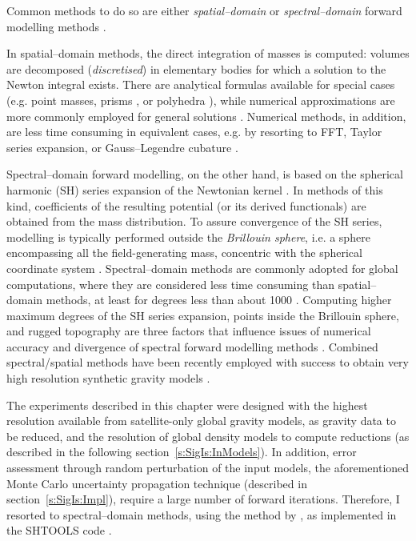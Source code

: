 Common methods to do so are either \textit{spatial--domain} or \textit{spectral--domain} forward modelling methods \parencite{Kuhn2005}.

In spatial--domain methods, the direct integration of masses is computed: volumes are decomposed (\textit{discretised}) in elementary bodies for which a solution to the Newton integral exists.
There are analytical formulas available for special cases (e.g. point masses, prisms \cites{Nagy2000}{Nagy2002}, or polyhedra \cites{Tsoulis2012}), while numerical approximations are more commonly employed for general solutions \parencites[e.g. spherical tesseroids][]{Heck2006}{Uieda2016}.
Numerical methods, in addition, are less time consuming in equivalent cases, e.g. by resorting to FFT, Taylor series expansion, or Gauss--Legendre cubature \parencite[see][and references therein]{Grombein2013}.

Spectral--domain forward modelling, on the other hand, is based on the spherical harmonic (SH) series expansion of the Newtonian kernel \parencites{Rummel1988}{Blakely1996}{Root2015}{Wieczorek2007}.
In methods of this kind, coefficients of the resulting potential (or its derived functionals) are obtained from the mass distribution.
To assure convergence of the SH series, modelling is typically performed outside the \textit{Brillouin sphere}, i.e. a sphere encompassing all the field-generating mass, concentric with the spherical coordinate system \parencite{Moritz1980}.
Spectral--domain methods are commonly adopted for global computations, where they are considered less time consuming than spatial--domain methods, at least for degrees less than about 1000 \parencite{Kuhn2005}.
Computing higher maximum degrees of the SH series expansion, points inside the Brillouin sphere, and rugged topography are three factors that influence issues of numerical accuracy and divergence of spectral forward modelling methods \parencites{Hu2015}{Hirt2017}.
Combined spectral/spatial methods have been recently employed with success to obtain very high resolution synthetic gravity models \parencite{Hirt2019}.

The experiments described in this chapter were designed with the highest resolution available from satellite-only global gravity models, as gravity data to be reduced, and the resolution of global density models to compute reductions (as described in the following section~\ref{s:SigIs:InModels}).
In addition, error assessment through random perturbation of the input models, the aforementioned Monte Carlo uncertainty propagation technique (described in section~\ref{s:SigIs:Impl}), require a large number of forward iterations.
Therefore, I resorted to spectral--domain methods, using the method by \textcite{Wieczorek2007}, as implemented in the SHTOOLS code \parencite{Wieczorek2018}.

